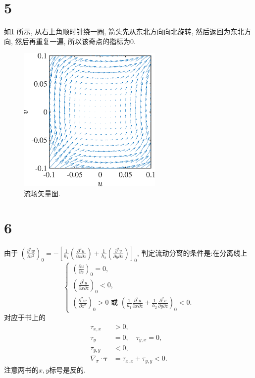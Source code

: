 \documentclass[12pt]{article}
\begin{document}
\section{5}

如\cref{fig:5} 所示, 从右上角顺时针绕一圈, 箭头先从东北方向向北旋转, 然后返回为东北方向, 然后再重复一遍, 所以该奇点的指标为0. 

\begin{figure}[htp]
	\centering
	\includegraphics[width=7cm]{5.eps}
	\caption{流场矢量图.}
	\label{fig:5}
\end{figure}

\section{6}

由于 $\left(\frac{\partial^{2} w}{\partial z^{2}}\right)_{0}=-\left[\frac{1}{h_{1}}\left(\frac{\partial^{2} u}{\partial x \partial z}\right)+\frac{1}{h_{2}}\left(\frac{\partial^{2} v}{\partial y \partial z}\right)\right]_{0}$, 判定流动分离的条件是:在分离线上
\begin{equation}
	\begin{cases}
		\left(\frac{\partial u}{\partial z}\right)_{0}=0, \\
		\left(\frac{\partial^{2} u}{\partial x \partial z}\right)_{0}<0, \\
		\left(\frac{\partial^{2} w}{\partial z^{2}}\right)_{0}>0 \text { 或 }\left(\frac{1}{h_{1}} \frac{\partial^{2} u}{\partial x \partial z}+\frac{1}{h_{2}} \frac{\partial^{2} v}{\partial y \partial z}\right)_{0}<0.
	\end{cases}
\end{equation}
对应于书上的
\begin{align}
	\tau_{x, x} &>0, \\
	\tau_{y} &=0, \quad \tau_{y, x}=0, \\
	\tau_{y, y} &<0, \\
	\nabla_{\pi} \cdot \boldsymbol{\tau} &=\tau_{x, x}+\tau_{y, y}<0.
\end{align}
注意两书的$x,y$标号是反的. 
\end{document}
